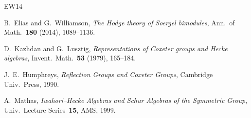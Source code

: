 \documentclass[11pt]{article}
\theoremstyle{definition}
\theoremstyle{remark}
\begin{document}
\begin{thebibliography}{EW14}

B.~Elias and G.~Williamson,
\emph{The Hodge theory of Soergel bimodules},
Ann.\ of Math.\ \textbf{180} (2014), 1089--1136.

D.~Kazhdan and G.~Lusztig,
\emph{Representations of Coxeter groups and Hecke algebras},
Invent.\ Math.\ \textbf{53} (1979), 165--184.

J.~E.~Humphreys,
\emph{Reflection Groups and Coxeter Groups},
Cambridge Univ.\ Press, 1990.

A.~Mathas,
\emph{Iwahori--Hecke Algebras and Schur Algebras of the Symmetric Group},
Univ.\ Lecture Series~\textbf{15}, AMS, 1999.

\end{thebibliography}
\end{document}
